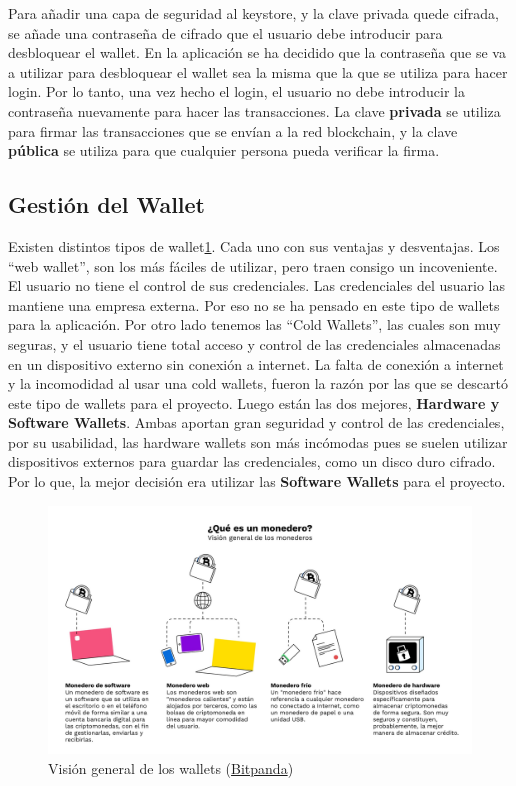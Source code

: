 Para añadir una capa de seguridad al keystore, y la clave privada quede cifrada, se añade una contraseña de cifrado que el usuario debe introducir para desbloquear el wallet. En la aplicación se ha decidido que la contraseña que se va a utilizar para desbloquear el wallet sea la misma que la que se utiliza para hacer login. Por lo tanto, una vez hecho el login, el usuario no debe introducir la contraseña nuevamente para hacer las transacciones. La clave \textbf{privada} se utiliza para firmar las transacciones que se envían a la red blockchain, y la clave \textbf{pública} se utiliza para que cualquier persona pueda verificar la firma. \\

\subsection{Gestión del Wallet}

Existen distintos tipos de wallet\ref{fig:tipos_wallet}. Cada uno con sus ventajas y desventajas. Los ``web wallet'', son los más fáciles de utilizar, pero traen consigo un incoveniente. El usuario no tiene el control de sus credenciales. Las credenciales del usuario las mantiene una empresa externa. Por eso no se ha pensado en este tipo de wallets para la aplicación. Por otro lado tenemos las ``Cold Wallets'', las cuales son muy seguras, y el usuario tiene total acceso y control de las credenciales almacenadas en un dispositivo externo sin conexión a internet. La falta de conexión a internet y la incomodidad al usar una cold wallets, fueron la razón por las que se descartó este tipo de wallets para el proyecto. Luego están las dos mejores, \textbf{Hardware y Software Wallets}. Ambas aportan gran seguridad y control de las credenciales, por su usabilidad, las hardware wallets son más incómodas pues se suelen utilizar dispositivos externos para guardar las credenciales, como un disco duro cifrado. Por lo que, la mejor decisión era utilizar las \textbf{Software Wallets} para el proyecto. \\

\begin{figure}[h!]
  \centering
  \includegraphics[width=0.8\linewidth]{figs/Desarrollo/Wallet/que_es_wallet}
  \caption[Visión general de los wallets]{Visión general de los wallets (\href{https://www.bitpanda.com/academy/en/lessons/what-is-a-wallet-and-how-do-i-get-one/}{Bitpanda})}
  \label{fig:tipos_wallet}
\end{figure}


